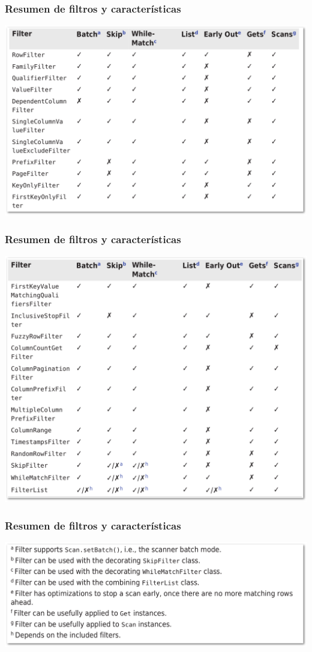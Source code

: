 \documentclass[14pt]{beamer}
\begin{document}
\begin{frame}
\begin{itemize}
\begin{frame}
  \frametitle{Resumen de filtros y características}
  \includegraphics[width=\textwidth]{img/filterlist1}
\end{frame}
\begin{frame}
  \frametitle{Resumen de filtros y características}
  \begin{center}
    \includegraphics[width=.8\textwidth]{img/filterlist2}
  \end{center}
\end{frame}
\begin{frame}
  \frametitle{Resumen de filtros y características}
  \includegraphics[width=\textwidth]{img/filterlist3}
\end{frame}


\end{itemize}
\end{frame}
\end{document}
